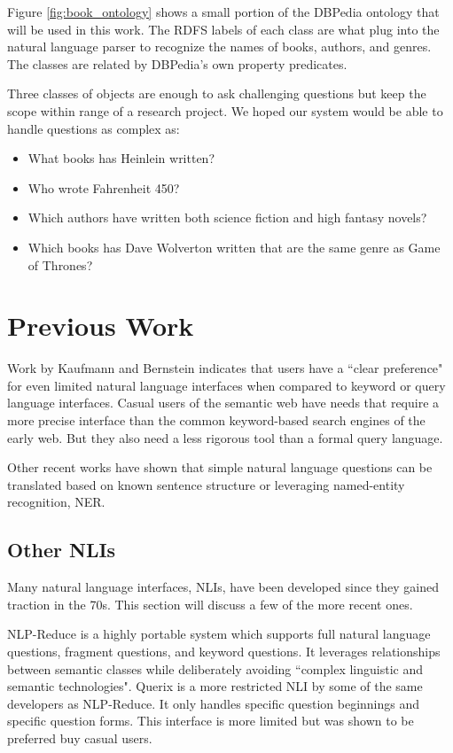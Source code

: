 \documentclass[11pt]{article}
\begin{document}
Figure \ref{fig:book_ontology} shows a small portion of the DBPedia ontology that
will be used in this work. The RDFS labels of each class are what plug into the
natural language parser to recognize the names of books, authors, and genres. 
The classes are related by DBPedia's own property predicates.

Three classes of objects are enough to ask challenging questions but keep the
scope within range of a research project. We hoped our system would be able to 
handle questions as complex as:
\begin{itemize}
\item What books has Heinlein written?
\item Who wrote Fahrenheit 450?
\item Which authors have written both science fiction and high fantasy novels?
\item Which books has Dave Wolverton written that are the same genre as Game of Thrones?
\end{itemize}

\section{Previous Work}

Work by Kaufmann and Bernstein \cite{usability} indicates
that users have a ``clear preference" for even limited natural language interfaces
when compared to keyword or query language interfaces.
Casual users of the semantic web have needs that require a more precise interface
than the common keyword-based search engines of the early web. But they also
need a less rigorous tool than a formal query language. \cite{usability}

Other recent works \cite{mapping, freya, galitsky, nlp-reduce, galitsky2, querix}
have shown that simple natural language questions can be translated based
on known sentence structure or leveraging named-entity recognition, NER.

\subsection{Other NLIs}
Many natural language interfaces, NLIs, have been developed since they gained traction
in the 70s\cite{usability}. This section will discuss a few of the more recent ones.

NLP-Reduce\cite{usability,nlp-reduce} is a highly portable system which supports full
natural language questions, fragment questions, and keyword questions.
It leverages relationships between semantic classes while deliberately avoiding
``complex linguistic and semantic technologies"\cite{nlp-reduce}.
Querix\cite{querix} is a more restricted NLI by some of the same developers as
NLP-Reduce. It only handles specific question beginnings and specific question forms. 
This interface is more limited but was shown to be preferred buy casual 
users\cite{usability}.
\end{document}

